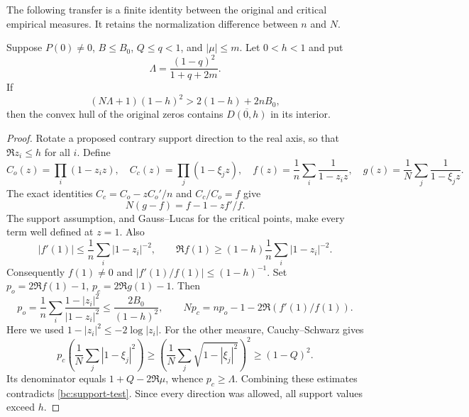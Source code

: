 The following transfer is a finite identity between the original and
critical empirical measures.  It retains the normalization difference
between $n$ and $N$.

\begin{lemma}\label{bc:poisson-support}
Suppose $P(0)\ne0$, $B\leq B_0$, $Q\leq q<1$, and $|\mu|\leq m$.
Let $0<h<1$ and put
\[
 \Lambda=\frac{(1-q)^2}{1+q+2m}.
\]
If
\begin{equation}\label{bc:support-test}
 (N\Lambda+1)(1-h)^2>2(1-h)+2nB_0,
\end{equation}
then the convex hull of the original zeros contains $\overline{D(0,h)}$
in its interior.
\end{lemma}

\begin{proof}
Rotate a proposed contrary support direction to the real axis, so that
$\Re z_i\leq h$ for all $i$.  Define
\[
 C_o(z)=\prod_i(1-z_i z),\quad C_c(z)=\prod_j(1-\xi_jz),
 \quad f(z)=\frac1n\sum_i\frac1{1-z_i z},\quad
 g(z)=\frac1N\sum_j\frac1{1-\xi_jz}.
\]
The exact identities $C_c=C_o-zC_o'/n$ and $C_c/C_o=f$ give
\begin{equation}\label{bc:poisson-identity}
 N(g-f)=f-1-zf'/f.
\end{equation}
The support assumption, and Gauss--Lucas for the critical points,
make every term well defined at $z=1$.  Also
\[
 |f'(1)|\leq\frac1n\sum_i|1-z_i|^{-2},\qquad
 \Re f(1)\geq(1-h)\frac1n\sum_i|1-z_i|^{-2}.
\]
Consequently $f(1)\ne0$ and $|f'(1)/f(1)|\leq(1-h)^{-1}$.
Set $p_o=2\Re f(1)-1$, $p_c=2\Re g(1)-1$.  Then
\[
 p_o=\frac1n\sum_i\frac{1-|z_i|^2}{|1-z_i|^2}
 \leq\frac{2B_0}{(1-h)^2},\qquad
 Np_c=np_o-1-2\Re(f'(1)/f(1)).
\]
Here we used $1-|z_i|^2\leq-2\log|z_i|$.
For the other measure, Cauchy--Schwarz gives
\[
 p_c\left(\frac1N\sum_j|1-\xi_j|^2\right)
 \geq\left(\frac1N\sum_j\sqrt{1-|\xi_j|^2}\right)^2
 \geq(1-Q)^2.
\]
Its denominator equals $1+Q-2\Re\mu$, whence $p_c\geq\Lambda$.
Combining these estimates contradicts \eqref{bc:support-test}.
Since every direction was allowed, all support values exceed $h$.
\end{proof}

